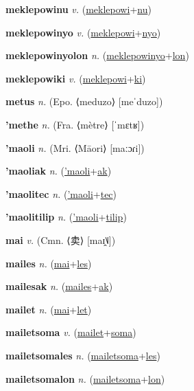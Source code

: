 \textbf{\hypertarget{meklepowinu}{meklepowinu}} \textit{v.} (\hyperlink{meklepowi}{meklepowi}+\allowbreak \hyperlink{nu}{nu})


\textbf{\hypertarget{meklepowinyo}{meklepowinyo}} \textit{v.} (\hyperlink{meklepowi}{meklepowi}+\allowbreak \hyperlink{nyo}{nyo})


\textbf{\hypertarget{meklepowinyolon}{meklepowinyolon}} \textit{n.} (\hyperlink{meklepowinyo}{meklepowinyo}+\allowbreak \hyperlink{lon}{lon})


\textbf{\hypertarget{meklepowiki}{meklepowiki}} \textit{v.} (\hyperlink{meklepowi}{meklepowi}+\allowbreak \hyperlink{ki}{ki})


\textbf{\hypertarget{metus}{metus}} \textit{n.} (Epo. ⟨meduzo⟩ [meˈduzo])


\textbf{\hypertarget{'methe}{'methe}} \textit{n.} (Fra. ⟨mètre⟩ [ˈmɛtʁ])


\textbf{\hypertarget{'maoli}{'maoli}} \textit{n.} (Mri. ⟨Māori⟩ [maːɔɾi])


\textbf{\hypertarget{'maoliak}{'maoliak}} \textit{n.} (\hyperlink{'maoli}{'maoli}+\allowbreak \hyperlink{ak}{ak})


\textbf{\hypertarget{'maolitec}{'maolitec}} \textit{n.} (\hyperlink{'maoli}{'maoli}+\allowbreak \hyperlink{tec}{tec})


\textbf{\hypertarget{'maolitilip}{'maolitilip}} \textit{n.} (\hyperlink{'maoli}{'maoli}+\allowbreak \hyperlink{tilip}{tilip})


\textbf{\hypertarget{mai}{mai}} \textit{v.} (Cmn. ⟨{\chinese{}卖}⟩ [maɪ̯˥˩])


\textbf{\hypertarget{mailes}{mailes}} \textit{n.} (\hyperlink{mai}{mai}+\allowbreak \hyperlink{les}{les})


\textbf{\hypertarget{mailesak}{mailesak}} \textit{n.} (\hyperlink{mailes}{mailes}+\allowbreak \hyperlink{ak}{ak})


\textbf{\hypertarget{mailet}{mailet}} \textit{n.} (\hyperlink{mai}{mai}+\allowbreak \hyperlink{let}{let})


\textbf{\hypertarget{mailetsoma}{mailetsoma}} \textit{v.} (\hyperlink{mailet}{mailet}+\allowbreak \hyperlink{soma}{soma})


\textbf{\hypertarget{mailetsomales}{mailetsomales}} \textit{n.} (\hyperlink{mailetsoma}{mailetsoma}+\allowbreak \hyperlink{les}{les})


\textbf{\hypertarget{mailetsomalon}{mailetsomalon}} \textit{n.} (\hyperlink{mailetsoma}{mailetsoma}+\allowbreak \hyperlink{lon}{lon})



